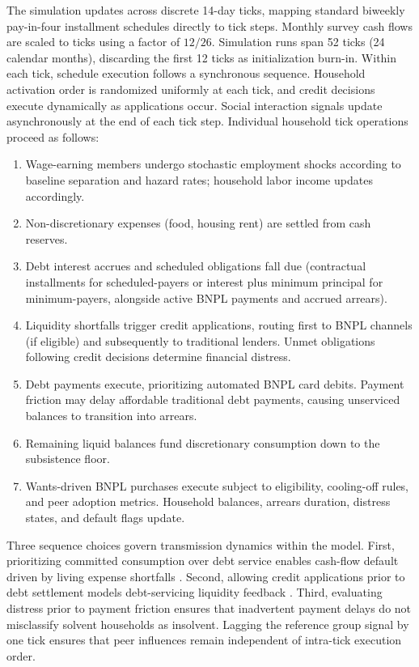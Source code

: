 The simulation updates across discrete 14-day ticks, mapping standard biweekly pay-in-four installment schedules directly to tick steps.
Monthly survey cash flows are scaled to ticks using a factor of $12/26$.
Simulation runs span 52 ticks (24 calendar months), discarding the first 12 ticks as initialization burn-in.
Within each tick, schedule execution follows a synchronous sequence.
Household activation order is randomized uniformly at each tick, and credit decisions execute dynamically as applications occur.
Social interaction signals update asynchronously at the end of each tick step.
Individual household tick operations proceed as follows:

\begin{enumerate}
    \item Wage-earning members undergo stochastic employment shocks according to baseline separation and hazard rates; household labor income updates accordingly.
    \item Non-discretionary expenses (food, housing rent) are settled from cash reserves.
    \item Debt interest accrues and scheduled obligations fall due (contractual installments for scheduled-payers or interest plus minimum principal for minimum-payers, alongside active \ac{BNPL} payments and accrued arrears).
    \item Liquidity shortfalls trigger credit applications, routing first to \ac{BNPL} channels (if eligible) and subsequently to traditional lenders. Unmet obligations following credit decisions determine financial distress.
    \item Debt payments execute, prioritizing automated \ac{BNPL} card debits. Payment friction may delay affordable traditional debt payments, causing unserviced balances to transition into arrears.
    \item Remaining liquid balances fund discretionary consumption down to the subsistence floor.
    \item Wants-driven \ac{BNPL} purchases execute subject to eligibility, cooling-off rules, and peer adoption metrics. Household balances, arrears duration, distress states, and default flags update.
\end{enumerate}

Three sequence choices govern transmission dynamics within the model.
First, prioritizing committed consumption over debt service enables cash-flow default driven by living expense shortfalls \cite{madeira2018chile}.
Second, allowing credit applications prior to debt settlement models debt-servicing liquidity feedback \cite{dorazio2017micro}.
Third, evaluating distress prior to payment friction ensures that inadvertent payment delays do not misclassify solvent households as insolvent.
Lagging the reference group signal by one tick ensures that peer influences remain independent of intra-tick execution order.

